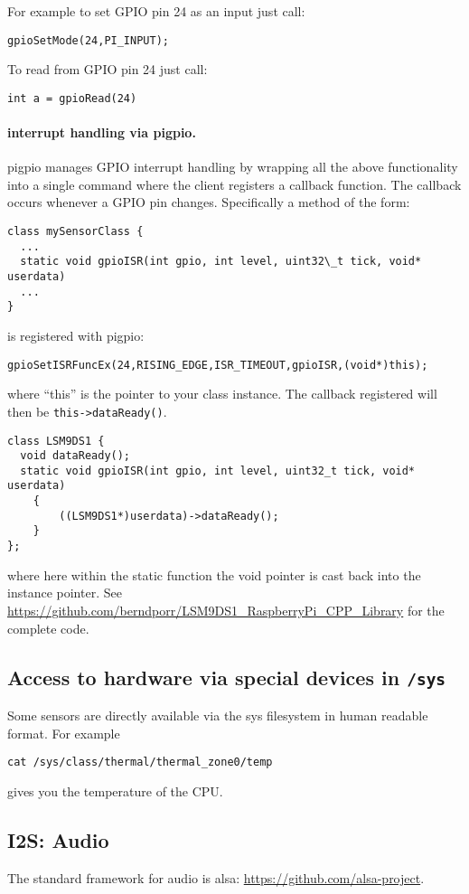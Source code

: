 \documentclass[12pt]{report}
\begin{document}
For example to set GPIO pin 24 as an input just call:
\begin{verbatim}
gpioSetMode(24,PI_INPUT);
\end{verbatim}

To read from GPIO pin 24 just call:
\begin{verbatim}
int a = gpioRead(24)
\end{verbatim}

\paragraph{interrupt handling via pigpio.}
pigpio manages GPIO interrupt handling by wrapping all the above
functionality into a single command where the client registers a
callback function. The callback occurs whenever a GPIO pin changes.
Specifically a method of the form:
\begin{verbatim}
class mySensorClass {
  ...
  static void gpioISR(int gpio, int level, uint32\_t tick, void* userdata)
  ...
}
\end{verbatim}
is registered with pigpio:
\begin{verbatim}
gpioSetISRFuncEx(24,RISING_EDGE,ISR_TIMEOUT,gpioISR,(void*)this);
\end{verbatim}
where ``this'' is the pointer to your class instance.
The callback registered will then be \texttt{this->dataReady()}.
\begin{verbatim}
class LSM9DS1 {
  void dataReady();
  static void gpioISR(int gpio, int level, uint32_t tick, void* userdata)
    {
        ((LSM9DS1*)userdata)->dataReady();
    }
};
\end{verbatim}
where here within the static function the void pointer is cast back into the instance pointer.
See \url{https://github.com/berndporr/LSM9DS1_RaspberryPi_CPP_Library} for the complete code.



\subsection{Access to hardware via special devices in \texttt{/sys}}
Some sensors are directly available via the sys filesystem in human readable format.
For example
\begin{verbatim}
cat /sys/class/thermal/thermal_zone0/temp
\end{verbatim}
gives you the temperature of the CPU.




\subsection{I2S: Audio}
The standard framework for audio is alsa: \url{https://github.com/alsa-project}.
\end{document}
